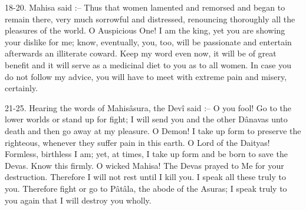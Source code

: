 18-20. Mahisa said :-- Thus that women lamented and remorsed and began to remain there, very much sorrowful and distressed, renouncing thoroughly all the pleasures of the world. O Auspicious One! I am the king, yet you are showing your dislike for me; know, eventually, you, too, will be passionate and entertain afterwards an illiterate coward. Keep my word even now, it will be of great benefit and it will serve as a medicinal diet to you as to all women. In case you do not follow my advice, you will have to meet with extreme pain and misery, certainly.

21-25. Hearing the words of Mahis\^asura, the Dev\^i said :-- O you fool! Go to the lower worlds or stand up for fight; I will send you and the other D\^anavas unto death and then go away at my pleasure. O Demon! I take up form to preserve the righteous, whenever they suffer pain in this earth. O Lord of the Daityas! Formless, birthless I am; yet, at times, I take up form and be born to save the Devas. Know this firmly. O wicked Mahisa! The Devas prayed to Me for your destruction. Therefore I will not rest until I kill you. I speak all these truly to you. Therefore fight or go to P\^at\^ala, the abode of the Asuras; I speak truly to you again that I will destroy you wholly.

